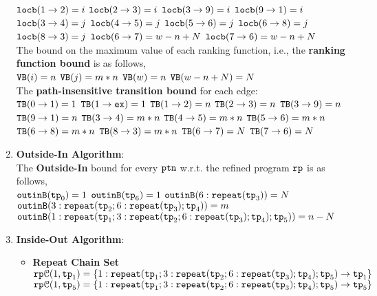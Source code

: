 \begin{enumerate}
      \quad $\mathtt{locb}(1 \to 2) = i$
      \quad $\mathtt{locb}(2 \to 3) = i$ 
      \quad $\mathtt{locb}(3 \to 9) = i$ 
      \quad $\mathtt{locb}(9 \to 1) = i$ 
      \quad $\mathtt{locb}(3 \to 4) = j$
      \quad $\mathtt{locb}(4 \to 5) = j$ 
      \quad $\mathtt{locb}(5 \to 6) = j$ 
      \quad $\mathtt{locb}(6 \to 8) = j$ 
      \quad $\mathtt{locb}(8 \to 3) = j$ 
      \quad $\mathtt{locb}(6 \to 7) = w - n + N$ 
      \quad $\mathtt{locb}(7 \to 6) = w - n + N$ 
  \\
  The bound on the maximum value of each ranking function, i.e., the \textbf{ranking function bound} is as follows,
  \\
  ${\mathtt{VB}}(i) = n$  \quad
  ${\mathtt{VB}}(j) = m * n$  \quad
  ${\mathtt{VB}}(w) = n$  \quad
  ${\mathtt{VB}}(w - n + N) = N$ 
  \\
  The \textbf{path-insensitive transition bound} for each edge:
  \\
  ${\mathtt{TB}}(0 \to 1) = 1$ 
  \quad ${\mathtt{TB}}(1 \to \mathtt{ex}) = 1$
  \quad ${\mathtt{TB}}(1 \to 2) = n$
  \quad ${\mathtt{TB}}(2 \to 3) = n$ 
  \quad ${\mathtt{TB}}(3 \to 9) = n$ 
  \\
  \quad ${\mathtt{TB}}(9 \to 1) = n$ 
  \quad ${\mathtt{TB}}(3 \to 4) = m * n$
  \quad ${\mathtt{TB}}(4 \to 5) = m * n$ 
  \quad ${\mathtt{TB}}(5 \to 6) = m * n$ 
  \\
  \quad ${\mathtt{TB}}(6 \to 8) = m * n$ 
  \quad ${\mathtt{TB}}(8 \to 3) = m * n$ 
  \quad ${\mathtt{TB}}(6 \to 7) = N$ 
  \quad ${\mathtt{TB}}(7 \to 6) = N$ 
  \item \textbf{Outside-In Algorithm}:\\
  The \textbf{Outside-In} bound for every $\mathtt{ptn}$ w.r.t. the refined program $\mathtt{rp}$ is as follows,
  \\
$\mathtt{outinB}(\mathtt{tp}_0) = 1$
\quad
$\mathtt{outinB}(\mathtt{tp}_6) = 1$
\quad
$\mathtt{outinB}(6 : \mathtt{repeat}(\mathtt{tp}_3)) = N $
\\
$\mathtt{outinB}(3: \mathtt{repeat}(\mathtt{tp}_2; 6 : \mathtt{repeat}(\mathtt{tp}_3); \mathtt{tp}_4)) = m $
\\
$\mathtt{outinB}(1: \mathtt{repeat}(\mathtt{tp}_1; 3: \mathtt{repeat}(\mathtt{tp}_2; 6 : \mathtt{repeat}(\mathtt{tp}_3); \mathtt{tp}_4); \mathtt{tp}_5)) = n - N $
\item \textbf{Inside-Out Algorithm}:
\begin{itemize}
  \item \textbf{Repeat Chain Set}
  \\
  $\mathtt{rp}\mathcal{C}(1, \mathtt{tp}_1) = 
  \{1: \mathtt{repeat}(\mathtt{tp}_1; 3: \mathtt{repeat}(\mathtt{tp}_2; 6 : \mathtt{repeat}(\mathtt{tp}_3); \mathtt{tp}_4); \mathtt{tp}_5) \to \mathtt{tp}_1\}$
  \\
  $\mathtt{rp}\mathcal{C}(1, \mathtt{tp}_5) = \{1: \mathtt{repeat}(\mathtt{tp}_1; 3: \mathtt{repeat}(\mathtt{tp}_2; 6 : \mathtt{repeat}(\mathtt{tp}_3); \mathtt{tp}_4); \mathtt{tp}_5) \to \mathtt{tp}_5\}$

\end{itemize}
\end{enumerate}
